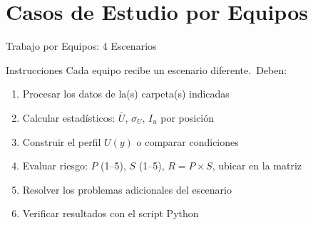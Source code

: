 \documentclass[aspectratio=169,12pt]{beamer}
\begin{document}
\section{Casos de Estudio por Equipos}

\begin{frame}{Trabajo por Equipos: 4 Escenarios}
	\begin{block}{Instrucciones}
		Cada equipo recibe un escenario diferente.\ Deben:
		\begin{enumerate}
			\item Procesar los datos de la(s) carpeta(s) indicadas
			\item Calcular estadísticos: $\bar{U}$, $\sigma_U$,
			      $I_u$ por posición
			\item Construir el perfil $U(y)$ o comparar condiciones
			\item Evaluar riesgo: $P$ (1--5), $S$ (1--5),
			      $R = P\!\times\!S$, ubicar en la matriz
			\item Resolver los problemas adicionales del escenario
			\item Verificar resultados con el script Python
		\end{enumerate}
	\end{block}
\end{frame}
\end{document}
